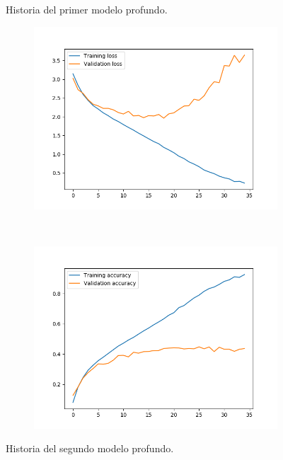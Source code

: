 \documentclass[11pt,a4paper]{article}
\begin{document}
\begin{figure}[H]
\begin{subfigure}{.5\textwidth}
    \label{fig:deep1-nodrop-acc}
  \end{subfigure}
  \caption{Historia del primer modelo profundo.}
  \label{fig:history-deep1-nodrop}
\end{figure}

\begin{figure}[H]
  \centering
  \begin{subfigure}{.5\textwidth}
    \includegraphics[scale=0.4]{img/deep2-nodrop-loss.png}
    \label{fig:deep2-nodrop-loss}
  \end{subfigure}%
  ~ \quad
  \begin{subfigure}{.5\textwidth}
    \includegraphics[scale=0.4]{img/deep2-nodrop-acc.png}
    \label{fig:deep2-nodrop-acc}
  \end{subfigure}
  \caption{Historia del segundo modelo profundo.}
  \label{fig:history-deep2-nodrop}
\end{figure}
\end{document}

